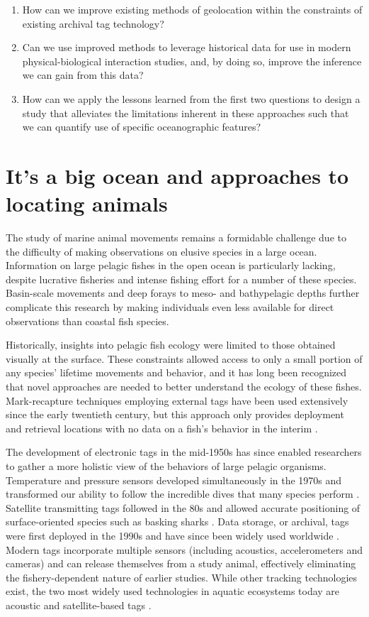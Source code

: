 \begin{enumerate}
    \item How can we improve existing methods of geolocation within the constraints of existing archival tag technology?
    \item Can we use improved methods to leverage historical data for use in modern physical-biological interaction studies, and, by doing so, improve the inference we can gain from this data?
    \item How can we apply the lessons learned from the first two questions to design a study that alleviates the limitations inherent in these approaches such that we can quantify use of specific oceanographic features?
\end{enumerate}

\section{It's a big ocean and approaches to locating animals}
The study of marine animal movements remains a formidable challenge due to the difficulty of making observations on elusive species in a large ocean. Information on large pelagic fishes in the open ocean is particularly lacking, despite lucrative fisheries and intense fishing effort for a number of these species. Basin-scale movements \citep{Skomal2009} and deep forays to meso- and bathypelagic depths \citep{Thorrold2014a} further complicate this research by making individuals even less available for direct observations than coastal fish species.

Historically, insights into pelagic fish ecology were limited to those obtained visually at the surface. These constraints allowed access to only a small portion of any species' lifetime movements and behavior, and it has long been recognized that novel approaches are needed to better understand the ecology of these fishes. Mark-recapture techniques employing external tags have been used extensively since the early twentieth century, but this approach only provides deployment and retrieval locations with no data on a fish's behavior in the interim \citep{Kohler2001}.

The development of electronic tags in the mid-1950s has since enabled researchers to gather a more holistic view of the behaviors of large pelagic organisms. Temperature and pressure sensors developed simultaneously in the 1970s and transformed our ability to follow the incredible dives that many species perform \citep{Carey1981}. Satellite transmitting tags followed in the 80s and allowed accurate positioning of surface-oriented species such as basking sharks \citep{Priede1984}. Data storage, or archival, tags were first deployed in the 1990s and have since been widely used worldwide \citep{Hussey2015}. Modern tags incorporate multiple sensors (including acoustics, accelerometers and cameras) and can release themselves from a study animal, effectively eliminating the fishery-dependent nature of earlier studies. While other tracking technologies exist, the two most widely used technologies in aquatic ecosystems today are acoustic and satellite-based tags \citep{Hussey2015}.

